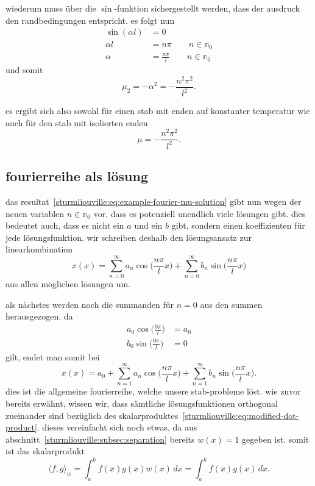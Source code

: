 wiederum muss über die $\sin$-funktion sichergestellt werden, dass der
ausdruck den randbedingungen entspricht.
es folgt nun
\[
\begin{aligned}
    \sin(\alpha l) &= 0 \\
    \alpha l &= n \pi \qquad n \in \mathbb{n}_0 \\
    \alpha &= \frac{n \pi}{l} \qquad n \in \mathbb{n}_0
\end{aligned}
\]
und somit
\[
    \mu_2 = -\alpha^{2} = -\frac{n^{2}\pi^{2}}{l^{2}}.
\]

es ergibt sich also sowohl für einen stab mit enden auf konstanter temperatur
wie auch für den stab mit isolierten enden
\begin{equation}
    \label{sturmliouville:eq:example-fourier-mu-solution}
    \mu
    =
    -\frac{n^{2}\pi^{2}}{l^{2}}.
\end{equation}

\subsection{fourierreihe als lösung}

das resultat~\eqref{sturmliouville:eq:example-fourier-mu-solution} gibt nun
wegen der neuen variablen $n \in \mathbb{n}_0$ vor, dass es potenziell
unendlich viele lösungen gibt.
dies bedeutet auch, dass es nicht ein $a$ und ein $b$ gibt, sondern einen
koeffizienten für jede lösungsfunktion.
wir schreiben deshalb den lösungsansatz zur linearkombination
\[
    x(x)
    =
    \sum_{n = 0}^{\infty} a_n\cos\biggl(\frac{n\pi}{l}x\biggr)
    +
    \sum_{n = 0}^{\infty} b_n\sin\biggl(\frac{n\pi}{l}x\biggr)
\]
aus allen möglichen lösungen um.

als nächstes werden noch die summanden für $n = 0$ aus den summen herausgezogen.
da
\[
    \begin{aligned}
        a_0 \cos\biggl(\frac{0 \pi}{l}\biggr) &= a_0 \\
        b_0 \sin\biggl(\frac{0 \pi}{l}\biggr) &= 0
    \end{aligned}
\]
gilt, endet man somit bei
\[
    x(x)
    =
    a_0
    +
    \sum_{n = 1}^{\infty} a_n\cos\biggl(\frac{n\pi}{l}x\biggr)
    +
    \sum_{n = 1}^{\infty} b_n\sin\biggl(\frac{n\pi}{l}x\biggr).
\]
dies ist die allgemeine fourierreihe, welche unsere stab-probleme löst.
wie zuvor bereits erwähnt, wissen wir, dass sämtliche lösungsfunktionen
orthogonal zueinander sind bezüglich des
skalarproduktes~\eqref{sturmliouville:eq:modified-dot-product}.
dieses vereinfacht sich noch etwas, da aus
abschnitt~\ref{sturmliouville:subsec:separation} bereits $w(x) = 1$ gegeben ist.
somit ist das skalarprodukt
\begin{equation}
    \label{sturmliouville:eq:example-fourier-dot-product}
    \langle f, g \rangle_w
    =
    \int_a^b f(x)g(x)w(x)\,dx
    =
    \int_a^b f(x)g(x)\,dx.
\end{equation}

